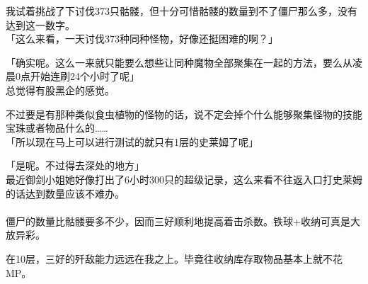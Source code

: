 我试着挑战了下讨伐373只骷髅，但十分可惜骷髅的数量到不了僵尸那么多，没有达到这一数字。\\

「这么来看，一天讨伐373种同种怪物，好像还挺困难的啊？」

「确实呢。这么一来就只能要么想些让同种魔物全部聚集在一起的方法，要么从凌晨0点开始连刷24个小时了呢」\\

总觉得有股黑企的感觉。

不过要是有那种类似食虫植物的怪物的话，说不定会掉个什么能够聚集怪物的技能宝珠或者物品什么的……\\

「所以现在马上可以进行测试的就只有1层的史莱姆了呢」

「是呢。不过得去深处的地方」\\

最近御剑小姐她好像打出了6小时300只的超级记录，这么来看不往返入口打史莱姆的话达到数量应该不难办。\\

\sqsplit\\

僵尸的数量比骷髅要多不少，因而三好顺利地提高着击杀数。铁球+收纳可真是大放异彩。

在10层，三好的歼敌能力远远在我之上。毕竟往收纳库存取物品基本上就不花MP。\\

